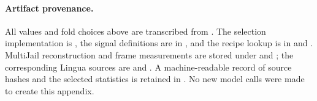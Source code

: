 \paragraph{Artifact provenance.}
All values and fold choices above are transcribed from
.
The selection implementation is
, the signal definitions are in
, and the recipe lookup is in
 and .
MultiJail reconstruction and frame measurements are stored under
 and
; the corresponding Lingua sources are
 and
.
A machine-readable record of source hashes and the selected statistics is retained in
. No new model calls were made to create this appendix.
